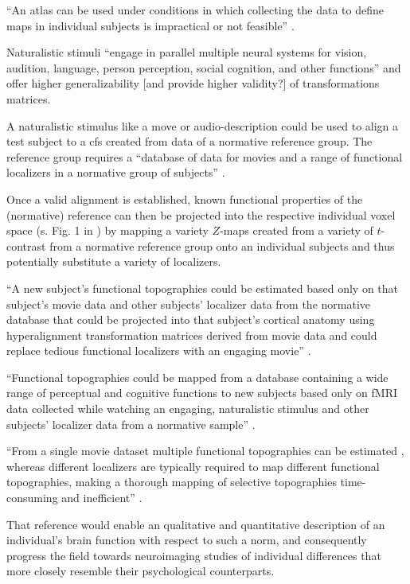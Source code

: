 %
``An atlas can be used under conditions in which collecting the data to define
maps in individual subjects is impractical or not feasible''
\citep{wang2015probabilistic}.


%
Naturalistic stimuli ``engage in parallel multiple neural systems for vision,
audition, language, person perception, social cognition, and other functions''
\citep{jiahui2020predicting} and offer higher generalizability [and provide
higher validity?] of transformations matrices.

%
A naturalistic stimulus like a move or audio-description could be used to align
a test subject to a \ac{cfs} created from data of a normative reference group.
%
The reference group requires a ``database of data for movies and a range of
functional localizers in a normative group of subjects''
\citep{jiahui2020predicting}.

%
Once a valid alignment is established, known functional properties of the
(normative) reference can then be projected into the respective individual voxel
space (s. Fig. 1 in \citep{nishimoto2016lining}) by mapping a variety $Z$-maps
created from a variety of $t$-contrast from a normative reference group onto an
individual subjects and thus potentially substitute a variety of localizers.

%
``A new subject's functional topographies could be estimated based only on that
subject's movie data and other subjects' localizer data from the normative
database that could be projected into that subject's cortical anatomy using
hyperalignment transformation matrices derived from movie data and could replace
tedious functional localizers with an engaging movie''
\citep{jiahui2020predicting}.

%
``Functional topographies could be mapped from a database containing a wide
range of perceptual and cognitive functions to new subjects based only on fMRI
data collected while watching an engaging, naturalistic stimulus and other
subjects' localizer data from a normative sample'' \citep{jiahui2020predicting}.

``From a single movie dataset multiple functional topographies can be estimated
\citep{guntupalli2016model}, whereas different localizers are typically required
to map different functional topographies, making a thorough mapping of selective
topographies time-consuming and inefficient'' \citep{jiahui2020predicting}.

%
That reference would enable an qualitative and quantitative description of an
individual's brain function with respect to such a norm, and consequently
progress the field towards neuroimaging studies of individual differences that
more closely resemble their psychological counterparts.

